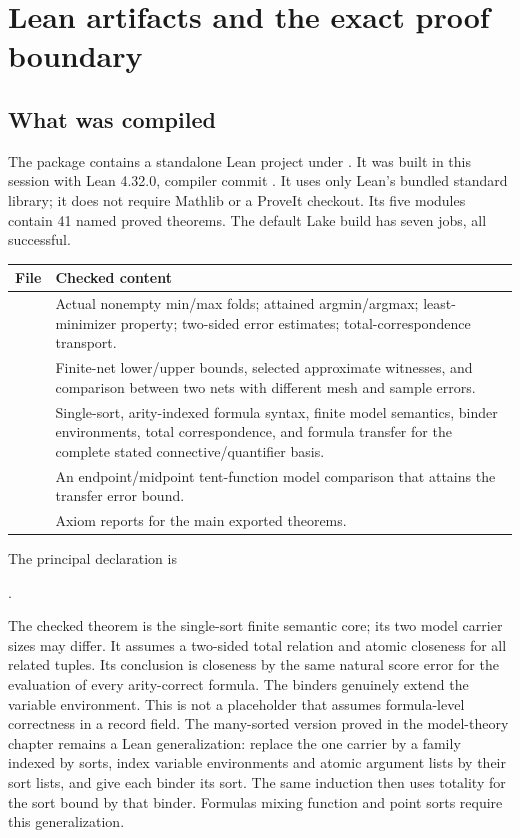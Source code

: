 \section{Lean artifacts and the exact proof boundary}\label{sec:verification}

\subsection{What was compiled}

The package contains a standalone Lean project under . It was built in this session with Lean 4.32.0, compiler commit
. It uses only Lean's bundled standard library; it does not require Mathlib or a ProveIt checkout. Its five modules contain 41 named proved theorems. The default Lake build has seven jobs, all successful.

\begin{longtable}{@{}P{.27\textwidth}P{.65\textwidth}@{}}
\toprule File & Checked content\\\midrule\endhead
{} & Actual nonempty min/max folds; attained argmin/argmax; least-minimizer property; two-sided error estimates; total-correspondence transport.\\
 & Finite-net lower/upper bounds, selected approximate witnesses, and comparison between two nets with different mesh and sample errors.\\
 & Single-sort, arity-indexed formula syntax, finite model semantics, binder environments, total correspondence, and formula transfer for the complete stated connective/quantifier basis.\\
 & An endpoint/midpoint tent-function model comparison that attains the transfer error bound.\\
 & Axiom reports for the main exported theorems.\\
\bottomrule
\end{longtable}

The principal declaration is
\begin{center}
.
\end{center}
The checked theorem is the single-sort finite semantic core; its two model carrier sizes may differ. It assumes a two-sided total relation and atomic closeness for all related tuples. Its conclusion is closeness by the same natural score error for the evaluation of every arity-correct formula. The binders genuinely extend the variable environment. This is not a placeholder that assumes formula-level correctness in a record field. The many-sorted version proved in the model-theory chapter remains a Lean generalization: replace the one carrier by a family indexed by sorts, index variable environments and atomic argument lists by their sort lists, and give each binder its sort. The same induction then uses totality for the sort bound by that binder. Formulas mixing function and point sorts require this generalization.

